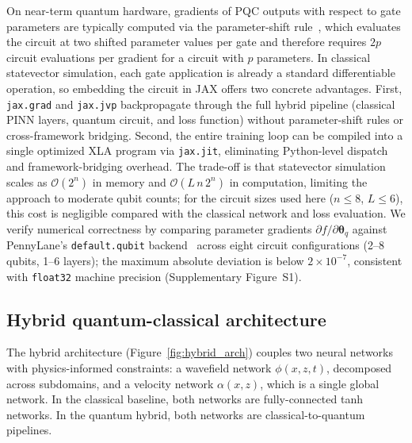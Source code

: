 \documentclass[11pt,a4paper]{article}
\begin{document}
On near-term quantum hardware, gradients of PQC outputs with respect to gate parameters are typically computed via the parameter-shift rule~\citep{mitarai2018quantum,schuld2019evaluating}, which evaluates the circuit at two shifted parameter values per gate and therefore requires $2p$ circuit evaluations per gradient for a circuit with $p$ parameters. In classical statevector simulation, each gate application is already a standard differentiable operation, so embedding the circuit in JAX offers two concrete advantages. First, \texttt{jax.grad} and \texttt{jax.jvp} backpropagate through the full hybrid pipeline (classical PINN layers, quantum circuit, and loss function) without parameter-shift rules or cross-framework bridging. Second, the entire training loop can be compiled into a single optimized XLA program via \texttt{jax.jit}, eliminating Python-level dispatch and framework-bridging overhead. The trade-off is that statevector simulation scales as $\mathcal{O}(2^n)$ in memory and $\mathcal{O}(L\,n\,2^n)$ in computation, limiting the approach to moderate qubit counts; for the circuit sizes used here ($n \leq 8$, $L \leq 6$), this cost is negligible compared with the classical network and loss evaluation. We verify numerical correctness by comparing parameter gradients $\partial f/\partial\boldsymbol{\theta}_q$ against PennyLane's \texttt{default.qubit} backend~\citep{bergholm2022pennylaneautomaticdifferentiationhybrid} across eight circuit configurations (2--8 qubits, 1--6 layers); the maximum absolute deviation is below $2\times 10^{-7}$, consistent with \texttt{float32} machine precision (Supplementary Figure~S1).

\subsection{Hybrid quantum-classical architecture}\label{sec:hybrid_network}

The hybrid architecture (Figure~\ref{fig:hybrid_arch}) couples two neural networks with physics-informed constraints: a wavefield network $\phi(x,z,t)$, decomposed across subdomains, and a velocity network $\alpha(x,z)$, which is a single global network. In the classical baseline, both networks are fully-connected tanh networks. In the quantum hybrid, both networks are classical-to-quantum pipelines.
\end{document}
